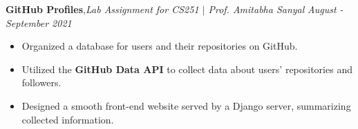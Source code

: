 \textbf{GitHub Profiles}\sep{\it Lab Assignment for CS251 $|$ Prof. Amitabha Sanyal}  \hfill{\sl \small August - September 2021}\\
\vspace{-8pt}
\begin{itemize}[itemsep = -1.3 mm, leftmargin=*]
\item Organized a database for users and their repositories on GitHub.
\item Utilized the {\bf GitHub Data API} to collect data about users' repositories and followers.
\item Designed a smooth front-end website served by a Django server, summarizing collected information.
\end{itemize}